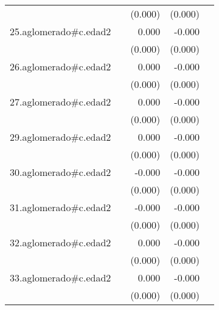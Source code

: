 {\begin{longtable}{l*{4}{D{.}{.}{-1}}}
            &                     &     (0.000)         &     (0.000)         &                     \\
\addlinespace
25.aglomerado#c.edad2&                     &       0.000         &      -0.000\sym{*}  &                     \\
            &                     &     (0.000)         &     (0.000)         &                     \\
\addlinespace
26.aglomerado#c.edad2&                     &       0.000         &      -0.000         &                     \\
            &                     &     (0.000)         &     (0.000)         &                     \\
\addlinespace
27.aglomerado#c.edad2&                     &       0.000         &      -0.000         &                     \\
            &                     &     (0.000)         &     (0.000)         &                     \\
\addlinespace
29.aglomerado#c.edad2&                     &       0.000         &      -0.000         &                     \\
            &                     &     (0.000)         &     (0.000)         &                     \\
\addlinespace
30.aglomerado#c.edad2&                     &      -0.000         &      -0.000\sym{***}&                     \\
            &                     &     (0.000)         &     (0.000)         &                     \\
\addlinespace
31.aglomerado#c.edad2&                     &      -0.000         &      -0.000\sym{***}&                     \\
            &                     &     (0.000)         &     (0.000)         &                     \\
\addlinespace
32.aglomerado#c.edad2&                     &       0.000         &      -0.000\sym{***}&                     \\
            &                     &     (0.000)         &     (0.000)         &                     \\
\addlinespace
33.aglomerado#c.edad2&                     &       0.000         &      -0.000\sym{***}&                     \\
            &                     &     (0.000)         &     (0.000)         &                     \\

\end{longtable}}
